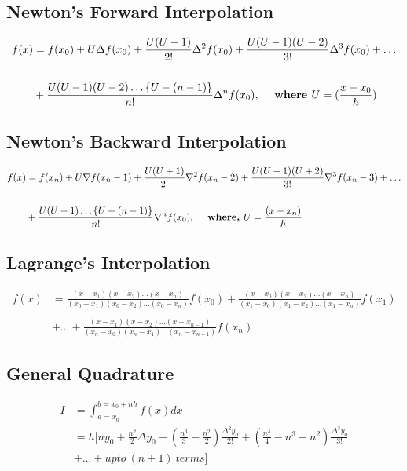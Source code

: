 \documentclass[a4paper, 12pt]{article}
\begin{document}
\thispagestyle{empty}

\begin{tcolorbox}

\section{Newton's Forward Interpolation}
\begin{align*}
  f(x) &= f(x_0)+U\Delta f(x_0)+\frac{U(U-1)}{2!}\Delta^2f(x_0)+\frac{U(U-1)(U-2)}{3!}\Delta^3f(x_0)+\dots\\
  \ \\
       &+ \frac{U(U-1)(U-2)\dots\{U-(n-1)\}}{n!}\Delta^nf(x_0),\ \ \ \ \text{\bfseries where $U=(\frac{x-x_0}{h})$}
\end{align*}

\end{tcolorbox}
\vskip30pt
\begin{tcolorbox}
\section{Newton's Backward Interpolation}
\begin{align*}
  f(x) &= f(x_n)+U\nabla f(x_n-1) + \frac{U(U+1)}{2!}\nabla^2f(x_n-2)+\frac{U(U+1)(U+2)}{3!}\nabla^3f(x_n-3)+\dots\\
  \ \\
       &+ \frac{U(U+1)\dots\{U+(n-1)\}}{n!}\nabla^nf(x_0),\ \ \ \ \text{\bfseries where, $U=\frac{(x-x_n)}{h}$}
\end{align*}
\end{tcolorbox}
\vskip30pt
\begin{tcolorbox}

\section{Lagrange's Interpolation}
\begin{align*}
  f(x)&=\frac{(x-x_1)(x-x_2)\dots(x-x_n)}{(x_0-x_1)(x_0-x_2)\dots(x_0-x_n)}f(x_0)+\frac{(x-x_0)(x-x_2)\dots(x-x_n)}{(x_1-x_0)(x_1-x_2)\dots(x_1-x_n)}f(x_1)\\
  \ \\
  &+ \dots +\frac{(x-x_1)(x-x_2)\dots(x-x_{n-1})}{(x_n-x_0)(x_n-x_1)\dots(x_n-x_{n-1})}f(x_n)
\end{align*}
\end{tcolorbox}
\vskip30pt
\begin{tcolorbox}

\section{General Quadrature}
\begin{align*}
  I &=\int_{a=x_0}^{b=x_0+nh}f(x)dx\\
    &= h[ny_0+\frac{n^2}{2}\Delta y_0+(\frac{n^3}{3}-\frac{n^2}{2})\frac{\Delta^2y_0}{2!}+(\frac{n^4}{4}-n^3-n^2)\frac{\Delta^3y_0}{3!}\\
    &+ \dots+upto\ (n+1)\ terms]
\end{align*}
\end{tcolorbox}
\end{document}
